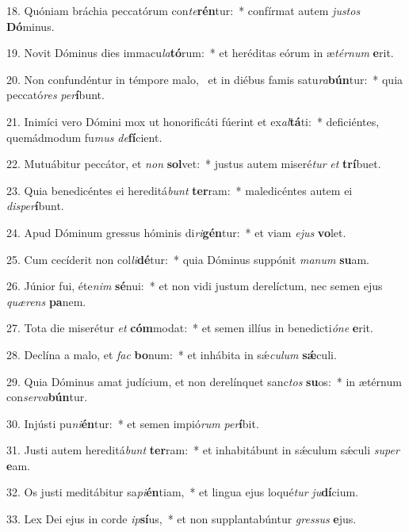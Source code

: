 18. Quóniam bráchia peccatórum con\textit{te}\textbf{rén}tur:~*  confírmat autem \textit{jus}\textit{tos} \textbf{Dó}minus.\

19. Novit Dóminus dies immacu\textit{la}\textbf{tó}rum:~*  et heréditas eórum in æ\textit{tér}\textit{num} \textbf{e}rit.\

20. Non confundéntur in témpore malo, \dag\  et in diébus famis satu\textit{ra}\textbf{bún}tur:~*  quia peccató\textit{res} \textit{per}\textbf{í}bunt.\

21. Inimíci vero Dómini mox ut honorificáti fúerint et ex\textit{al}\textbf{tá}ti:~*  deficiéntes, quemádmodum fu\textit{mus} \textit{de}\textbf{fí}cient.\

22. Mutuábitur peccátor, et \textit{non} \textbf{sol}vet:~*  justus autem miseré\textit{tur} \textit{et} \textbf{trí}buet.\

23. Quia benedicéntes ei hereditá\textit{bunt} \textbf{ter}ram:~*  maledicéntes autem ei \textit{dis}\textit{per}\textbf{í}bunt.\

24. Apud Dóminum gressus hóminis di\textit{ri}\textbf{gén}tur:~*  et viam \textit{e}\textit{jus} \textbf{vo}let.\

25. Cum cecíderit non col\textit{li}\textbf{dé}tur:~*  quia Dóminus suppónit \textit{ma}\textit{num} \textbf{su}am.\

26. Júnior fui, éte\textit{nim} \textbf{sé}nui:~*  et non vidi justum derelíctum, nec semen ejus \textit{quæ}\textit{rens} \textbf{pa}nem.\

27. Tota die miserétur \textit{et} \textbf{cóm}modat:~*  et semen illíus in benedicti\textit{ó}\textit{ne} \textbf{e}rit.\

28. Declína a malo, et \textit{fac} \textbf{bo}num:~*  et inhábita in sǽ\textit{cu}\textit{lum} \textbf{sǽ}culi.\

29. Quia Dóminus amat judícium, et non derelínquet sanc\textit{tos} \textbf{su}os:~*  in ætérnum con\textit{ser}\textit{va}\textbf{bún}tur.\

30. Injústi pu\textit{ni}\textbf{én}tur:~*  et semen impió\textit{rum} \textit{per}\textbf{í}bit.\

31. Justi autem hereditá\textit{bunt} \textbf{ter}ram:~*  et inhabitábunt in sǽculum sǽculi \textit{su}\textit{per} \textbf{e}am.\

32. Os justi meditábitur sa\textit{pi}\textbf{én}tiam,~*  et lingua ejus loqué\textit{tur} \textit{ju}\textbf{dí}cium.\

33. Lex Dei ejus in corde \textit{ip}\textbf{sí}us,~*  et non supplantabúntur \textit{gres}\textit{sus} \textbf{e}jus.\

